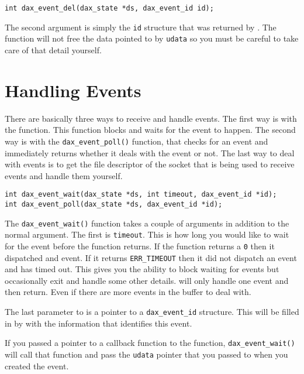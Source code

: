 \begin{verbatim}
int dax_event_del(dax_state *ds, dax_event_id id);
\end{verbatim}

The second argument is simply the \texttt{id} structure that was returned by \eventadd.  The \eventdel function will not free the data pointed to by \texttt{udata} so you must be careful to take care of that detail yourself.

\section{Handling Events}

There are basically three ways to receive and handle events.  The first way is with the \eventwait function.  This function blocks and waits for the event to happen.  The second way is with the \verb|dax_event_poll()| function, that checks for an event and immediately returns whether it deals with the event or not.  The last way to deal with events is to get the file descriptor of the socket that is being used to receive events and handle them yourself.

\begin{verbatim}
int dax_event_wait(dax_state *ds, int timeout, dax_event_id *id);
int dax_event_poll(dax_state *ds, dax_event_id *id);
\end{verbatim}


The \texttt{dax\_event\_wait()} function takes a couple of arguments in addition to the normal \daxstate argument.  The first is \texttt{timeout}.  This is how long you would like to wait for the event before the function returns.  If the function returns a \verb|0| then it dispatched and event.  If it returns \texttt{ERR\_TIMEOUT} then it did not dispatch an event and has timed out.  This gives you the ability to block waiting for events but occasionally exit and handle some other details.  \eventwait will only handle one event and then return.  Even if there are more events in the buffer to deal with.

The last parameter to \eventwait is a pointer to a \texttt{dax\_event\_id} structure.  This will be filled in by \eventwait with the information that identifies this event.

If you passed a pointer to a callback function to the \eventadd function, \verb|dax_event_wait()| will call that function and pass the \texttt{udata} pointer that you passed to \eventadd when you created the event.

